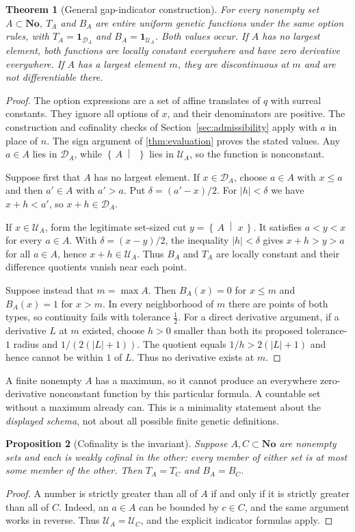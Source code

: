 \documentclass[11pt,letterpaper]{article}
\numberwithin{equation}{section}
\newtheorem{theorem}{Theorem}[section]
\newtheorem{proposition}[theorem]{Proposition}
\theoremstyle{definition}
\theoremstyle{remark}
\newcommand{\No}{\mathbf{No}}
\newcommand{\U}{\mathcal{U}}
\newcommand{\D}{\mathcal{D}}
\newcommand{\cut}[2]{\left\{\,#1\;\middle|\;#2\,\right\}}
\newcommand{\ind}{\mathbf{1}}
\begin{document}
\begin{theorem}[General gap-indicator construction]\label{thm:general}
For every nonempty set $A\subset\No$, $T_A$ and $B_A$ are entire uniform
genetic functions under the same option rules, with
$T_A=\ind_{\D_A}$ and $B_A=\ind_{\U_A}$. Both values occur.
If $A$ has no largest element, both functions are locally constant
everywhere and have zero derivative everywhere. If $A$ has a largest
element $m$, they are discontinuous at $m$ and are not differentiable
there.
\end{theorem}
\begin{proof}
The option expressions are a set of affine translates of $q$ with surreal
constants. They ignore all options of $x$, and their denominators are
positive. The construction and cofinality checks of
Section~\ref{sec:admissibility} apply with $a$ in place of $n$.
The sign argument of \cref{thm:evaluation} proves the stated values.
Any $a\in A$ lies in $\D_A$, while $\cut{A}{}$ lies in $\U_A$, so the
function is nonconstant.

Suppose first that $A$ has no largest element. If $x\in\D_A$, choose
$a\in A$ with $x\le a$ and then $a'\in A$ with $a'>a$. Put
$\delta=(a'-x)/2$. For $|h|<\delta$ we have $x+h<a'$, so
$x+h\in\D_A$.

If $x\in\U_A$, form the legitimate set-sized cut
$y=\cut{A}{x}$. It satisfies $a<y<x$ for every $a\in A$. With
$\delta=(x-y)/2$, the inequality $|h|<\delta$ gives $x+h>y>a$ for
all $a\in A$, hence $x+h\in\U_A$. Thus $B_A$ and $T_A$ are locally
constant and their difference quotients vanish near each point.

Suppose instead that $m=\max A$. Then $B_A(x)=0$ for $x\le m$ and
$B_A(x)=1$ for $x>m$. In every neighborhood of $m$ there are points of
both types, so continuity fails with tolerance $\tfrac12$.
For a direct derivative argument, if a derivative $L$ at $m$ existed,
choose $h>0$ smaller than both its proposed tolerance-$1$ radius and
$1/(2(|L|+1))$. The quotient equals $1/h>2(|L|+1)$ and hence cannot
be within $1$ of $L$. Thus no derivative exists at $m$.
\end{proof}

A finite nonempty $A$ has a maximum, so it cannot produce an everywhere
zero-derivative nonconstant function by this particular formula. A
countable set without a maximum already can. This is a minimality
statement about the \emph{displayed schema}, not about all possible
finite genetic definitions.

\begin{proposition}[Cofinality is the invariant]
Suppose $A,C\subset\No$ are nonempty sets and each is weakly cofinal in
the other: every member of either set is at most some member of the other.
Then $T_A=T_C$ and $B_A=B_C$.
\end{proposition}
\begin{proof}
A number is strictly greater than all of $A$ if and only if it is strictly
greater than all of $C$. Indeed, an $a\in A$ can be bounded by $c\in C$,
and the same argument works in reverse. Thus $\U_A=\U_C$, and the
explicit indicator formulas apply.
\end{proof}
\end{document}
